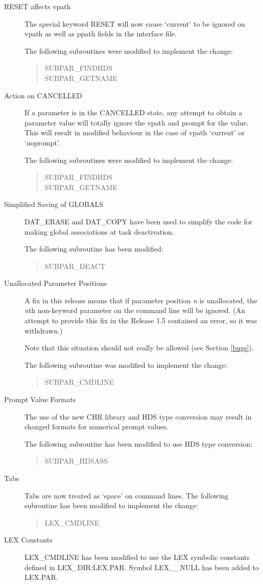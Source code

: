 \begin{description}
\item[RESET affects vpath]
The special keyword RESET will now cause `current' to be ignored on vpath as
well as ppath fields in the interface file.

The following subroutines were modified to implement the change:
\begin{quote}
SUBPAR\_FINDHDS\\
SUBPAR\_GETNAME
\end{quote}

\item[Action on CANCELLED]
If a parameter is in the CANCELLED state, any attempt to obtain a parameter
value will totally ignore the vpath and prompt for the value.
This will result in modified behaviour in the case of vpath `current' or
`noprompt'.

The following subroutines were modified to implement the change:
\begin{quote}
SUBPAR\_FINDHDS\\
SUBPAR\_GETNAME
\end{quote}

\item[Simplified Saving of GLOBALS]
DAT\_ERASE and DAT\_COPY have been used to simplify the code for making
global associations at task deactivation.

The following subroutine has been modified:
\begin{quote}
SUBPAR\_DEACT
\end{quote}

\item[Unallocated Parameter Positions]
A fix in this release means that if parameter position {\em n} is unallocated,
the {\em n}\/th non-keyword parameter on the command line will be ignored.
(An attempt to provide this fix in the Release 1.5 contained an error, so it
was withdrawn.)

Note that this situation should not really be allowed (see Section \ref{bugs}).

The following subroutine was modified to implement the change:
\begin{quote}
SUBPAR\_CMDLINE
\end{quote}

\item[Prompt Value Formats]
The use of the new CHR library and HDS type conversion may result in changed 
formats for numerical prompt values.

The following subroutine has been modified to use HDS type conversion:
\begin{quote}
SUBPAR\_HDSASS
\end{quote}

\item[Tabs]
Tabs are now treated as `space' on command lines.
The following subroutine has been modified to implement the change:
\begin{quote}
LEX\_CMDLINE
\end{quote}

\item[LEX Constants]
LEX\_CMDLINE has been modified to use the LEX symbolic constants defined in
LEX\_DIR:LEX.PAR.
Symbol LEX\_\_NULL has been added to LEX.PAR.
\end{description}

